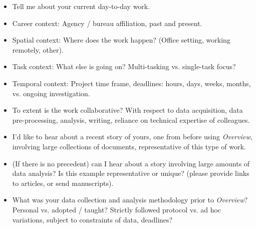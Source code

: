 
\begin{itemize}
    \item Tell me about your current day-to-day work.
    \item Career context: Agency / bureau affiliation, past and present.
    \item Spatial context: Where does the work happen? (Office setting, working remotely, other).
    \item Task context: What else is going on? Multi-tasking vs. single-task focus?
    \item Temporal context: Project time frame, deadlines: hours, days, weeks, months, vs. ongoing investigation.
\end{itemize}


\begin{itemize}
    \item To extent is the work collaborative? With respect to data acquisition, data pre-processing, analysis, writing, reliance on technical expertise of colleagues.
\end{itemize}


\begin{itemize}
    \item I'd like to hear about a recent story of yours, one from before using {\it Overview}, involving large collections of documents, representative of this type of work.
    \item (If there is no precedent) can I hear about a story involving large amounts of data analysis? Is this example representative or unique? (please provide links to articles, or send manuscripts).
\end{itemize}


\begin{itemize}
    \item What was your data collection and analysis methodology prior to {\it Overview}? Personal vs. adopted / taught? Strictly followed protocol vs. ad hoc variations, subject to constraints of data, deadlines?
\end{itemize}


